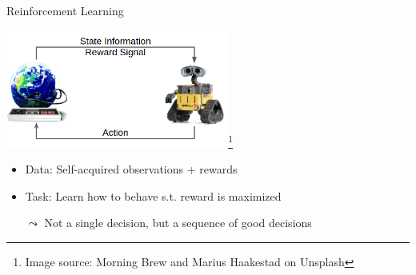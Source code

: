 \documentclass[aspectratio=169, handout]{../latex_main/tntbeamer}  %
\begin{document}
\begin{frame}[c]{Reinforcement Learning}
	
	\centering
	\includegraphics[width=0.55\textwidth]{images/rl_comic.png}\footnote{Image source: Morning Brew and Marius Haakestad on Unsplash}
	
	\bigskip
	
	\begin{itemize}
		\item Data: Self-acquired observations + rewards
		\item Task: Learn how to behave s.t. reward is maximized
		\item[$\leadsto$] Not a single decision, but a sequence of good decisions
	\end{itemize}	
	
	
\end{frame}
\end{document}
